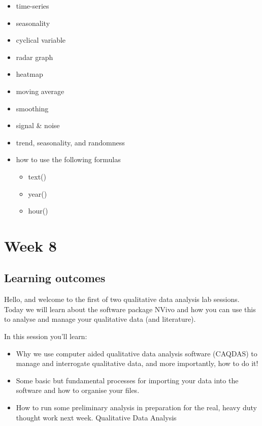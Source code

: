 \documentclass[]{book}
\providecommand{\tightlist}{%
  \setlength{\itemsep}{0pt}\setlength{\parskip}{0pt}}
\theoremstyle{definition}
\theoremstyle{definition}
\theoremstyle{definition}
\theoremstyle{remark}
\begin{document}
\begin{itemize}
\tightlist
\item
  time-series
\item
  seasonality
\item
  cyclical variable
\item
  radar graph
\item
  heatmap
\item
  moving average
\item
  smoothing
\item
  signal \& noise
\item
  trend, seasonality, and randomness
\item
  how to use the following formulas

  \begin{itemize}
  \tightlist
  \item
    text()
  \item
    year()
  \item
    hour()
  \end{itemize}
\end{itemize}

\hypertarget{week8}{%
\chapter{Week 8}\label{week8}}

\hypertarget{learning-outcomes-7}{%
\section{Learning outcomes}\label{learning-outcomes-7}}

Hello, and welcome to the first of two qualitative data analysis lab
sessions. Today we will learn about the software package NVivo and how
you can use this to analyse and manage your qualitative data (and
literature).

In this session you'll learn:

\begin{itemize}
\tightlist
\item
  Why we use computer aided qualitative data analysis software (CAQDAS)
  to manage and interrogate qualitative data, and more importantly, how
  to do it!
\item
  Some basic but fundamental processes for importing your data into the
  software and how to organise your files.
\item
  How to run some preliminary analysis in preparation for the real,
  heavy duty thought work next week. Qualitative Data Analysis
\end{itemize}
\end{document}
